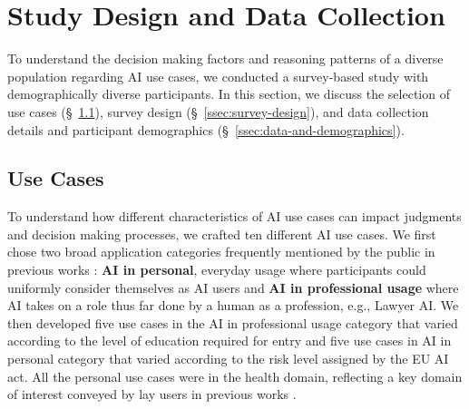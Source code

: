 \section{Study Design and Data Collection}
\label{sec:study-design}
To understand the decision making factors and reasoning patterns of a diverse population regarding AI use cases, we conducted a survey-based study with demographically diverse participants. In this section, we discuss the selection of use cases (\S~\ref{ssec:use-cases}), survey design (\S~\ref{ssec:survey-design}), and data collection details and participant demographics (\S~\ref{ssec:data-and-demographics}).

\subsection{Use Cases}
\label{ssec:use-cases}
To understand how different characteristics of AI use cases can impact judgments and decision making processes, we crafted ten different AI use cases. We first chose two broad application categories frequently mentioned by the public in previous works \citep{kieslich2024myfuture,mun2024participaidemocraticsurveyingframework}: \textbf{AI in personal}, everyday usage where participants could uniformly consider themselves as AI users and \textbf{AI in professional usage} where AI takes on a role thus far done by a human as a profession, e.g., Lawyer AI. We then developed five use cases in the AI in professional usage category that varied according to the level of education required for entry and five use cases in AI in personal category that varied according to the risk level assigned by the EU AI act. All the personal use cases were in the health domain, reflecting a key domain of interest conveyed by lay users in previous works \citep{mun2024participaidemocraticsurveyingframework,kieslich2024myfuture}.

